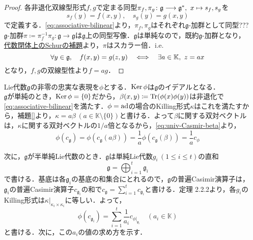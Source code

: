 \documentclass[rep_main]{subfiles}
\begin{document}
\begin{proof}
	各非退化双線型形式$f, g$で定まる同型$\pi_f, \pi_g\colon \mathfrak{g} \longrightarrow \mathfrak{g}^*,\ x \mapsto s_f, s_g$を
	\begin{equation}
		s_f(y) = f(x, y),\quad  s_g(y) = g(x, y)
	\end{equation}
	で定義する．\eqref{eq:associative-bilinear}より，$\pi_f, \pi_g$はそれぞれ$\mathfrak{g}$-加群として同型???\\
	$\mathfrak{g}$-加群$\pi \coloneqq \pi_f^{-1}\pi_g\colon \mathfrak{g} \to \mathfrak{g}$は$\mathfrak{g}$上の同型写像．$\mathfrak{g}$は単純なので，既約$\mathfrak{g}$-加群となり，\hyperref[col:Schur-closed]{代数閉体上のSchurの補題}より，$\pi$はスカラー倍．i.e.
	\begin{equation}
		\forall y \in \mathfrak{g},\quad  f(x, y) = g(z, y)  \quad \Longleftrightarrow \quad  \exists a \in \mathbb{K},\ z = ax
	\end{equation}
	となり，$f, g$の双線型性より$f = ag$．
\end{proof}
Lie代数$\mathfrak{g}$の非零の忠実な表現を$\phi$とする．$\operatorname{Ker}\phi$は$\mathfrak{g}$のイデアルとなる．\\
$\mathfrak{g}$が単純のとき，$\operatorname{Ker}\phi = \{0\}$だから，$\beta(x, y) \coloneqq \Tr(\phi(x)\phi(y))$は非退化で\eqref{eq:associative-bilinear}を満たす．$\phi = \operatorname{ad}$の場合のKilling形式$\kappa$はこれを満たすから，補題\ref{}より，$\kappa = a\beta\ (a \in \mathbb{K} \setminus \{0\})$と書ける．よって$\beta$に関する双対ベクトルは，$\kappa$に関する双対ベクトルの$1/a$倍となるから，\eqref{eq:univ-Casmir-beta}より，
\begin{equation}
	\phi(c_\mathfrak{g}) = \phi(c_\mathfrak{g}(a\beta)) = \frac{1}{a}\phi(c_\mathfrak{g}(\beta)) = \frac{1}{a}c_\phi
\end{equation}

次に，$\mathfrak{g}$が半単純Lie代数のとき．$\mathfrak{g}$は単純Lie代数$g_i\ (1 \leq i \leq t)$の直和
\begin{equation}
	\mathfrak{g} = \bigoplus_{i=1}^t\mathfrak{g}_i
\end{equation}
で書ける．基底は各$\mathfrak{g}_i$の基底の和集合にとれるので，$\mathfrak{g}$の普遍Casimir演算子は，$\mathfrak{g}_i$の普遍Casimir演算子$c_{\mathfrak{g}_i}$の和で$c_\mathfrak{g} = \sum_{i=1}^t c_{\mathfrak{g}_i}$と書ける．定理 2.2.2より，各$g_i$のKilling形式は$\kappa|_{\kappa_i \times \kappa_i}$に等しい．よって，
\begin{equation}
	\phi(c_{\mathfrak{g}_i}) = \sum_{i=1}^t \frac{1}{a_i}c_{\phi|_{\mathfrak{g}_i}}\quad  (a_i \in \mathbb{K})
\end{equation}
と書ける．次に，この$a_i$の値の求め方を示す．
\end{document}
